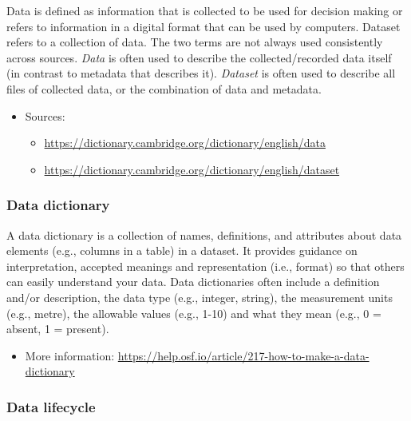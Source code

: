 \documentclass[
  oneside]{book}
\providecommand{\tightlist}{%
  \setlength{\itemsep}{0pt}\setlength{\parskip}{0pt}}
\begin{document}
Data is defined as information that is collected to be used for decision making or refers to information in a digital format that can be used by computers. Dataset refers to a collection of data. The two terms are not always used consistently across sources. \emph{Data} is often used to describe the collected/recorded data itself (in contrast to metadata that describes it). \emph{Dataset} is often used to describe all files of collected data, or the combination of data and metadata.

\begin{itemize}
\tightlist
\item
  Sources:

  \begin{itemize}
  \tightlist
  \item
    \url{https://dictionary.cambridge.org/dictionary/english/data}
  \item
    \url{https://dictionary.cambridge.org/dictionary/english/dataset}
  \end{itemize}
\end{itemize}

\subsubsection*{Data dictionary}\label{data-dictionary}

A data dictionary is a collection of names, definitions, and attributes about data elements (e.g., columns in a table) in a dataset. It provides guidance on interpretation, accepted meanings and representation (i.e., format) so that others can easily understand your data. Data dictionaries often include a definition and/or description, the data type (e.g., integer, string), the measurement units (e.g., metre), the allowable values (e.g., 1-10) and what they mean (e.g., 0 = absent, 1 = present).

\begin{itemize}
\tightlist
\item
  More information: \url{https://help.osf.io/article/217-how-to-make-a-data-dictionary}
\end{itemize}

\subsubsection*{Data lifecycle}\label{datalifecycle}
\end{document}
